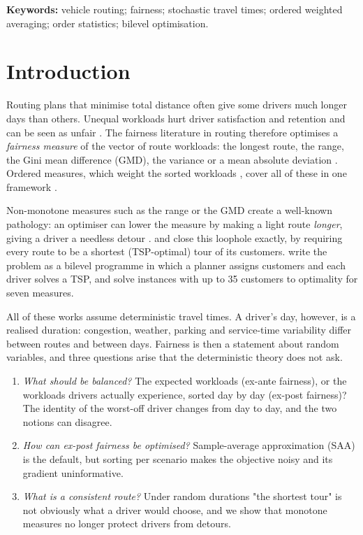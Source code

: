 \documentclass[11pt]{article}
\theoremstyle{definition}
\begin{document}
\noindent\textbf{Keywords:} vehicle routing; fairness; stochastic travel times;
ordered weighted averaging; order statistics; bilevel optimisation.

\section{Introduction}

Routing plans that minimise total distance often give some drivers much
longer days than others. Unequal workloads hurt driver satisfaction and
retention and can be seen as unfair \citep{matl2018workload}. The fairness
literature in routing therefore optimises a \emph{fairness measure} of the
vector of route workloads: the longest route, the range, the Gini mean
difference (GMD), the variance or a mean absolute deviation
\citep{matl2018workload,karsu2015inequity,bektas2020lp}. Ordered measures, which
weight the sorted workloads \citep{yager1988owa,ogryczak2003solving,nickel2005location},
cover all of these in one framework \citep{blanco2026optimization}.

Non-monotone measures such as the range or the GMD create a well-known
pathology: an optimiser can lower the measure by making a light route
\emph{longer}, giving a driver a needless detour
\citep{matl2018workload}. \citet{vanrossum2026efficient,vanrossum2026enforcing}
and \citet{ljubic2026fair} close this loophole exactly, by requiring every route to
be a shortest (TSP-optimal) tour of its customers. \citet{ljubic2026fair}
write the problem as a bilevel programme in which a planner assigns customers
and each driver solves a TSP, and solve instances with up to 35 customers to
optimality for seven measures.

All of these works assume deterministic travel times. A driver's day,
however, is a realised duration: congestion, weather, parking and
service-time variability differ between routes and between days. Fairness
is then a statement about random variables, and three questions arise that
the deterministic theory does not ask.
\begin{enumerate}
\item \emph{What should be balanced?} The expected workloads (ex-ante
fairness), or the workloads drivers actually experience, sorted day by day
(ex-post fairness)? The identity of the worst-off driver changes from day to
day, and the two notions can disagree.
\item \emph{How can ex-post fairness be optimised?} Sample-average
approximation (SAA) is the default, but sorting per scenario makes the
objective noisy and its gradient uninformative.
\item \emph{What is a consistent route?} Under random durations "the
shortest tour" is not obviously what a driver would choose, and we show
that monotone measures no longer protect drivers from detours.
\end{enumerate}
\end{document}
